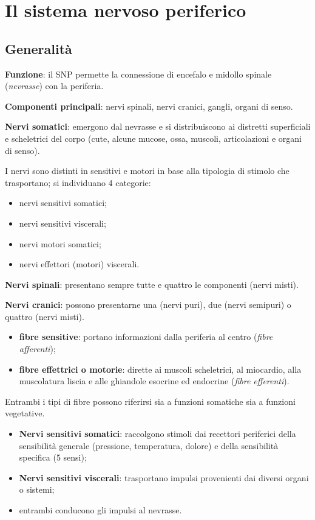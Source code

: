 \chapter{Il sistema nervoso periferico}

\section{Generalità}

\textbf{Funzione}: il SNP permette la connessione di encefalo e midollo spinale
(\textit{nevrasse}) con la periferia.

\textbf{Componenti principali}: nervi spinali, nervi cranici, gangli, organi di
senso.

\textbf{Nervi somatici}: emergono dal nevrasse e si distribuiscono ai distretti
superficiali e scheletrici del corpo (cute, alcune mucose, ossa, muscoli,
articolazioni e organi di senso).

I nervi sono distinti in sensitivi e motori in base alla tipologia di stimolo
che trasportano; si individuano 4 categorie:
\begin{itemize}
  \item nervi sensitivi somatici;
  \item nervi sensitivi viscerali;
  \item nervi motori somatici;
  \item nervi effettori (motori) viscerali.
\end{itemize}

\textbf{Nervi spinali}: presentano sempre tutte e quattro le componenti
(nervi misti).

\textbf{Nervi cranici}: possono presentarne una (nervi puri), due (nervi
semipuri) o quattro (nervi misti).

\begin{itemize}
  \item \textbf{fibre sensitive}: portano informazioni dalla periferia al
    centro (\textit{fibre afferenti});
  \item \textbf{fibre effettrici o motorie}: dirette ai muscoli scheletrici,
    al miocardio, alla muscolatura liscia e alle ghiandole esocrine ed
    endocrine (\textit{fibre efferenti}).
\end{itemize}
Entrambi i tipi di fibre possono riferirsi sia a funzioni somatiche sia a
funzioni vegetative.

\begin{itemize}
  \item \textbf{Nervi sensitivi somatici}: raccolgono stimoli dai recettori
    periferici della sensibilità generale (pressione, temperatura, dolore) e
    della sensibilità specifica (5 sensi);
  \item \textbf{Nervi sensitivi viscerali}: trasportano impulsi provenienti
    dai diversi organi o sistemi;
  \item entrambi conducono gli impulsi al nevrasse.
\end{itemize}

